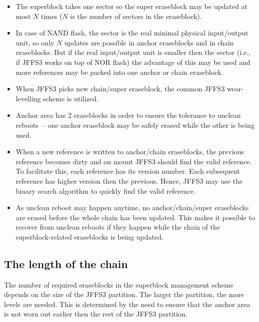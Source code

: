 \documentclass[12pt,a4paper,oneside,titlepage]{article}
\begin{document}
\begin{itemize}

\item The superblock takes one sector so the super eraseblock may be updated at
most $N$ times ($N$ is the number of sectors in the eraseblock).

\item In case of NAND flash, the sector is the real minimal physical
input/output unit, so only $N$ updates are possible in anchor eraseblocks
and in chain eraseblocks. But if the real input/output unit is smaller then
the sector (i.e., if JFFS3 works on top of NOR flash) the advantage of this may
be used and more references may be packed into one anchor or chain eraseblock.

\item When JFFS3 picks new chain/super eraseblock, the common JFFS3
\mbox{wear-levelling} scheme is utilized.

\item Anchor area has 2 eraseblocks in order to ensure the tolerance to unclean
reboots~-- one anchor eraseblock may be safely erased while the other is being
used.

\item When a new reference is written to anchor/chain eraseblocks, the previous
reference becomes dirty and on mount JFFS3 should find the valid reference. To
facilitate this, each reference has its version number.  Each subsequent
reference has higher version then the previous. Hence, JFFS3 may use the
binary search algorithm to quickly find the valid reference.

\item As unclean reboot may happen anytime, no anchor/chain/super eraseblocks
are erased before the whole chain has been updated. This makes it possible to
recover from unclean reboots if they happen while the chain of the
\mbox{superblock-related} eraseblocks is being updated.

\end{itemize}

%
%
\subsection{The length of the chain}

The number of required eraseblocks in the superblock management scheme depends
on the size of the JFFS3 partition. The larger the partition, the more levels
are needed. This is determined by the need to ensure that the anchor area is
not worn out earlier then the rest of the JFFS3 partition.
\end{document}
